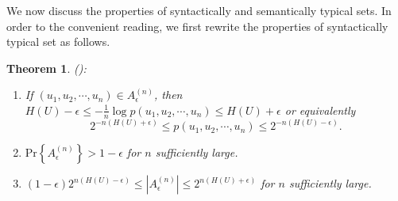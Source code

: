 \documentclass[12pt, draftclsnofoot,onecolumn]{IEEEtran}
\newtheorem{theorem}{\bf{Theorem}}
\begin{document}
We now discuss the properties of syntactically and semantically typical sets. In order to the convenient reading, we first rewrite the properties of syntactically typical set as follows.

\begin{theorem}
(\cite[Theorem 3.1.2]{Book_Cover}):
\begin{enumerate}[(1)]
    \item If $\left(u_1,u_2,\cdots,u_n\right)\in A_{\epsilon}^{(n)}$, then $H(U)-\epsilon \leq -\frac{1}{n}\log p\left(u_1,u_2,\cdots,u_n\right) \leq H(U)+\epsilon$ or equivalently
         \begin{equation}\label{AEPinequality}
        2^{-n\left(H(U)+\epsilon\right)}\leq p\left(u_1,u_2,\cdots,u_n\right) \leq 2^{-n\left(H(U)-\epsilon\right)}.
        \end{equation}
    \item $\text{Pr}\left\{A_{\epsilon}^{(n)}\right\}>1-\epsilon$ for $n$ sufficiently large.
    \item $\left(1-\epsilon\right) 2^{n\left(H(U)-\epsilon\right)}\leq \left|A_{\epsilon}^{(n)}\right| \leq 2^{n\left(H(U)+\epsilon\right)}$ for $n$ sufficiently large.
  \end{enumerate}
\end{theorem}
\end{document}
